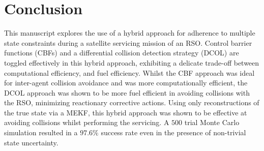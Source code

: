 \section{Conclusion}
This manuscript explores the use of a hybrid approach for adherence to multiple state constraints during a satellite servicing mission of an RSO. Control barrier functions (CBFs) and a differential collision detection strategy (DCOL) are toggled effectively in this hybrid approach, exhibiting a delicate trade-off between computational efficiency, and fuel efficiency. Whilst the CBF approach was ideal for inter-agent collision avoidance and was more computationally efficient, the DCOL approach was shown to be more fuel efficient in avoiding collisions with the RSO, minimizing reactionary corrective actions. Using only reconstructions of the true state via a MEKF, this hybrid approach was shown to be effective at avoiding collisions whilst performing the servicing. A $500$ trial Monte Carlo simulation resulted in a $97.6\%$ success rate even in the presence of non-trivial state uncertainty.